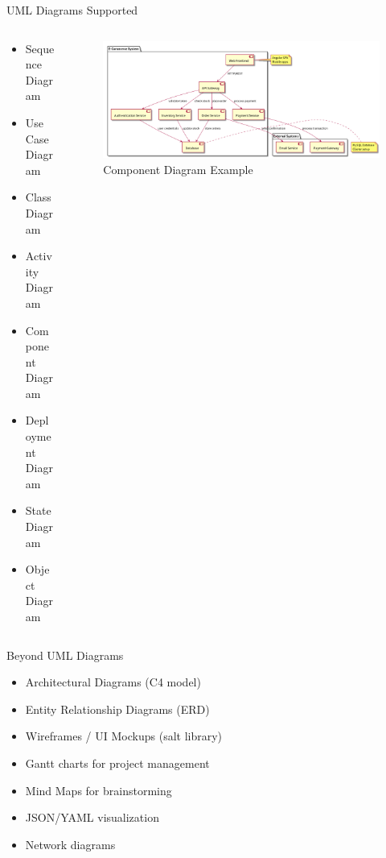 \documentclass{beamer}
\begin{document}
\begin{frame}[t]{UML Diagrams Supported}
    \begin{columns}
    \begin{column}{0.4\textwidth}
        \begin{itemize}
            \item Sequence Diagram
            \item Use Case Diagram
            \item Class Diagram
            \item Activity Diagram
            \item Component Diagram
            \item Deployment Diagram
            \item State Diagram
            \item Object Diagram
        \end{itemize}
    \end{column}
    \begin{column}{0.6\textwidth}
        \centering
        \begin{figure}
        \begin{center}
            \includegraphics[width=\textwidth]{images/component.png}
        \end{center}
        \caption{Component Diagram Example}
        \end{figure}
        
    \end{column}
    \end{columns}
\end{frame}

\begin{frame}[t]{Beyond UML Diagrams}
    \begin{itemize}
        \item Architectural Diagrams (C4 model)
        \item Entity Relationship Diagrams (ERD)
        \item Wireframes / UI Mockups (salt library)
        \item Gantt charts for project management
        \item Mind Maps for brainstorming
        \item JSON/YAML visualization
        \item Network diagrams
    \end{itemize}
\end{frame}
\end{document}
